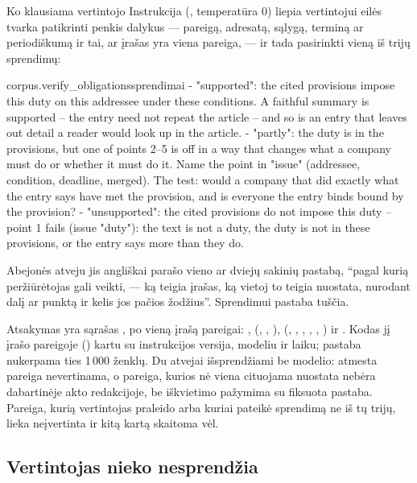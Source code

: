 \begin{aibox}{Ko klausiama vertintojo}
Instrukcija (, temperatūra 0) liepia vertintojui eilės tvarka
patikrinti penkis dalykus --- pareigą, adresatą, sąlygą, terminą ar periodiškumą ir tai, ar
įrašas yra viena pareiga, --- ir tada pasirinkti vieną iš trijų sprendimų:

\begin{promptexcerpt}{corpus.verify_obligations}{sprendimai}
- "supported": the cited provisions impose this duty on this addressee under these conditions. A faithful summary is supported – the entry need not repeat the article – and so is an entry that leaves out detail a reader would look up in the article.
- "partly": the duty is in the provisions, but one of points 2–5 is off in a way that changes what a company must do or whether it must do it. Name the point in "issue" (addressee, condition, deadline, merged). The test: would a company that did exactly what the entry says have met the provision, and is everyone the entry binds bound by the provision?
- "unsupported": the cited provisions do not impose this duty – point 1 fails (issue "duty"): the text is not a duty, the duty is not in these provisions, or the entry says more than they do.
\end{promptexcerpt}

Abejonės atveju jis angliškai parašo vieno ar dviejų sakinių pastabą, \enquote{pagal kurią
peržiūrėtojas gali veikti, --- ką teigia įrašas, ką vietoj to teigia nuostata, nurodant dalį ar
punktą ir kelis jos pačios žodžius}. Sprendimui  pastaba tuščia.
\end{aibox}

Atsakymas yra sąrašas , po vieną įrašą pareigai: ,
 (, , ), 
(, , , , , ) ir
. Kodas jį įrašo pareigoje () kartu su instrukcijos
versija, modeliu ir laiku; pastaba nukerpama ties 1\,000 ženklų. Du atvejai išsprendžiami be
modelio: atmesta pareiga nevertinama, o pareiga, kurios nė viena cituojama nuostata nebėra
dabartinėje akto redakcijoje, be iškvietimo pažymima  su fiksuota pastaba.
Pareiga, kurią vertintojas praleido arba kuriai pateikė sprendimą ne iš tų trijų, lieka
neįvertinta ir kitą kartą skaitoma vėl.

\subsection{Vertintojas nieko nesprendžia}

